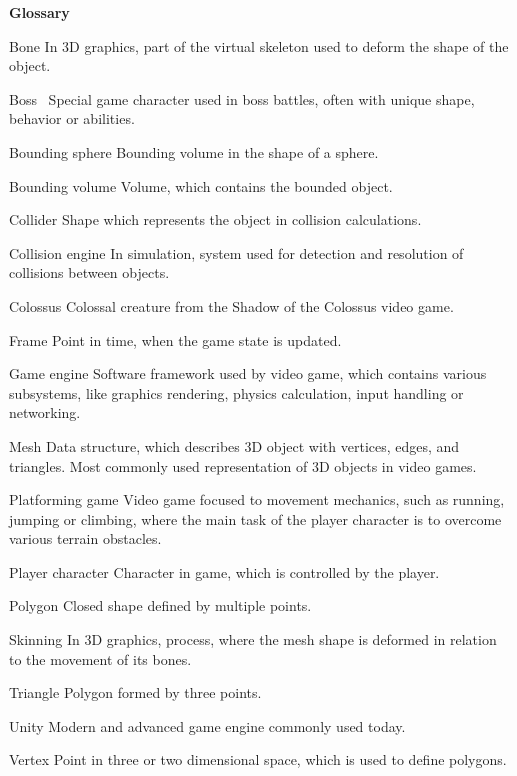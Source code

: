 \documentclass[a4paper]{article}
\newenvironment{definitions}
{\begin{description}[style=nextline]}
{\end{description}}
\begin{document}

\tableofcontents

\newpage
\listoffigures

\newpage

\begin{Large}
	\textbf{Glossary}
\end{Large}

\begin{definitions}
	\item[Bone] In 3D graphics, part of the virtual skeleton used to deform the shape of the object.
	\item[Boss~] Special game character used in boss battles, often with unique shape, behavior or abilities.
	\item[Bounding sphere] Bounding volume in the shape of a sphere.
	\item[Bounding volume] Volume, which contains the bounded object.
	\item[Collider] Shape which represents the object in collision calculations.
	\item[Collision engine] In simulation, system used for detection and resolution of collisions between objects.
	\item[Colossus] Colossal creature from the Shadow of the Colossus video game.
	\item[Frame] Point in time, when the game state is updated.
	\item[Game engine] Software framework used by video game, which contains various subsystems, like graphics rendering, physics calculation, input handling or networking.
	\item[Mesh] Data structure, which describes 3D object with vertices, edges, and triangles. Most commonly used representation of 3D objects in video games.
	\item[Platforming game] Video game focused to movement mechanics, such as running, jumping or climbing, where the main task of the player character is to overcome various terrain obstacles.
	\item[Player character] Character in game, which is controlled by the player.
	\item[Polygon] Closed shape defined by multiple points.
	\item[Skinning] In 3D graphics, process, where the mesh shape is deformed in relation to the movement of its bones.
	\item[Triangle] Polygon formed by three points.
	\item[Unity] Modern and advanced game engine commonly used today.
	\item[Vertex] Point in three or two dimensional space, which is used to define polygons.

\end{definitions}
\end{document}
